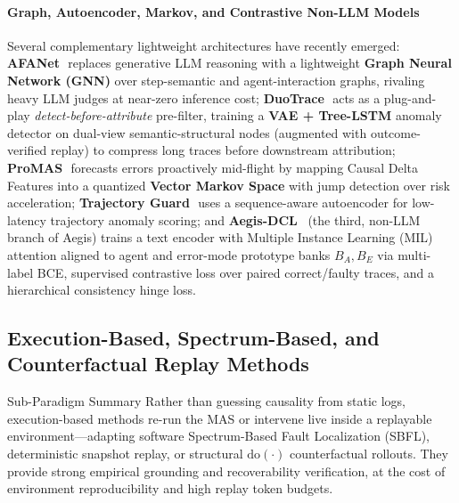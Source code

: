 \paragraph{Graph, Autoencoder, Markov, and Contrastive Non-LLM Models}
Several complementary lightweight architectures have recently emerged:
\textbf{AFANet}~\citep{li2026afanet}\,\webtag replaces generative LLM reasoning with a lightweight \textbf{Graph Neural Network (GNN)} over step-semantic and agent-interaction graphs, rivaling heavy LLM judges at near-zero inference cost;
\textbf{DuoTrace}~\citep{zhang2026duotrace}\,\webtag acts as a plug-and-play \emph{detect-before-attribute} pre-filter, training a \textbf{VAE + Tree-LSTM} anomaly detector on dual-view semantic-structural nodes (augmented with outcome-verified replay) to compress long traces before downstream attribution;
\textbf{ProMAS}~\citep{zhao2026promas}\,\webtag forecasts errors proactively mid-flight by mapping Causal Delta Features into a quantized \textbf{Vector Markov Space} with jump detection over risk acceleration;
\textbf{Trajectory Guard}~\citep{advani2026trajguard}\,\webtag uses a sequence-aware autoencoder for low-latency trajectory anomaly scoring; and
\textbf{Aegis-DCL}~\citep{kong2026aegis} (the third, non-LLM branch of Aegis) trains a text encoder with Multiple Instance Learning (MIL) attention aligned to agent and error-mode prototype banks $B_A, B_E$ via multi-label BCE, supervised contrastive loss over paired correct/faulty traces, and a hierarchical consistency hinge loss.

\subsection{Execution-Based, Spectrum-Based, and Counterfactual Replay Methods}\label{sec:replay}
\begin{summarybox}[s4]{Sub-Paradigm Summary \hfill \replaybadge}
Rather than guessing causality from static logs, execution-based methods re-run the MAS or intervene live inside a replayable environment---adapting software Spectrum-Based Fault Localization (SBFL), deterministic snapshot replay, or structural $\text{do}(\cdot)$ counterfactual rollouts. They provide strong empirical grounding and recoverability verification, at the cost of environment reproducibility and high replay token budgets.
\end{summarybox}

